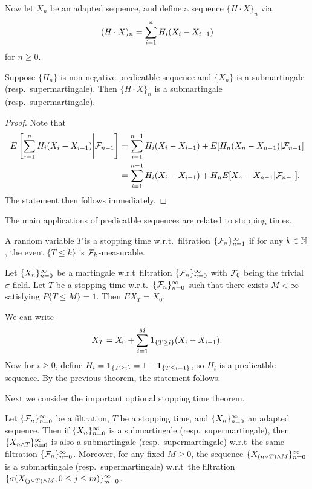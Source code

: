 \documentclass[a4paper]{article}
\begin{document}
Now let $X_n$ be an adapted sequence, and define 
a sequence $\{ H \cdot X \}_n$ via 
\[
(H \cdot X)_n = \sum_{i=1}^n H_i (X_i - X_{i - 1})
\]
for $n \geq 0$.

\begin{thm}
  Suppose $\{ H_n \}$ is non-negative predicatble sequence
  and $\{ X_n \}$ is a submartingale (resp.\ supermartingale). Then 
  $\{H \cdot X\}_n$ is a submartingale (resp.\ supermartingale).
\end{thm}

\begin{proof}
  Note that 
  \begin{align*}
    E \left[ \sum_{i=1}^n H_i (X_i - X_{i - 1}) \middle| \mathcal{F}_{n - 1} \right] 
    &= \sum_{i=1}^{n - 1} H_i (X_i - X_{i - 1})
    + E[H_n (X_n - X_{n - 1}) | \mathcal{F}_{n - 1}] \\
    &= \sum_{i=1}^{n - 1} H_i (X_i - X_{i - 1})
    + H_n E[X_n - X_{n - 1} | \mathcal{F}_{n - 1}].
  \end{align*}
  The statement then follows immediately.
\end{proof}

The main applications of predicatble sequences are related 
to stopping times.

\begin{defi}
  A random variable $T$ is a stopping time w.r.t.\ filtration 
  $\{ \mathcal{F}_n \}_{n=1}^\infty$ if for any $k \in \mathbb{N}$, 
  the event $\{ T \leq k \}$ is $\mathcal{F}_k$-measurable.
\end{defi}

\begin{eg}
  Let $\{ X_n \}_{n=0}^\infty$ be a martingale w.r.t\
  filtration $\{ \mathcal{F}_n \}_{n=0}^\infty$ with $\mathcal{F}_0$ being the trivial 
  $\sigma$-field. Let $T$ be 
  a stopping time w.r.t.\ $\{ \mathcal{F}_n \}_{n=0}^\infty$ 
  such that there exists $M < \infty$ satisfying $P \{ T \leq M \} = 1$.
  Then $E X_T = X_0$.

  We can write 
  \[
  X_T = X_0 + \sum_{i=1}^M \operatorname{\mathbf{1}}_{\{T \geq i\}} (X_i - X_{i - 1}).
  \]
  Now for $i \geq 0$, 
  define $H_i = \operatorname{\mathbf{1}}_{\{T \geq i\}} = 1 - \operatorname{\mathbf{1}}_{\{T \leq i - 1\}}$,
  so $H_i$ is a predicatble sequence. By the previous theorem, 
  the statement follows.
\end{eg}

Next we consider the important optional stopping time theorem.

\begin{thm}
  Let $\{ \mathcal{F}_n \}_{n=0}^\infty$ be a filtration, $T$ be a stopping time,
  and $\{ X_n \}_{n=0}^\infty$ an adapted sequence. Then 
  if $\{ X_n \}_{n=0}^\infty$ is a submartingale (resp.\ supermartingale), then 
  $\{ X_{n \wedge T} \}_{n=0}^\infty$ is also a submartingale (resp.\ supermartingale)
  w.r.t\ the same filtration $\{ \mathcal{F}_n \}_{n=0}^\infty$. Moreover, for any fixed 
  $M \geq 0$, the sequence $\{ X_{(n \vee T) \wedge M} \}_{n=0}^\infty$
  is a submartingale (resp.\ supermartingale) w.r.t\ the filtration
  $\{ \sigma (X_{(j \vee T) \wedge M}, 0 \leq j \leq m) \}_{m=0}^\infty$.
\end{thm}
\end{document}
